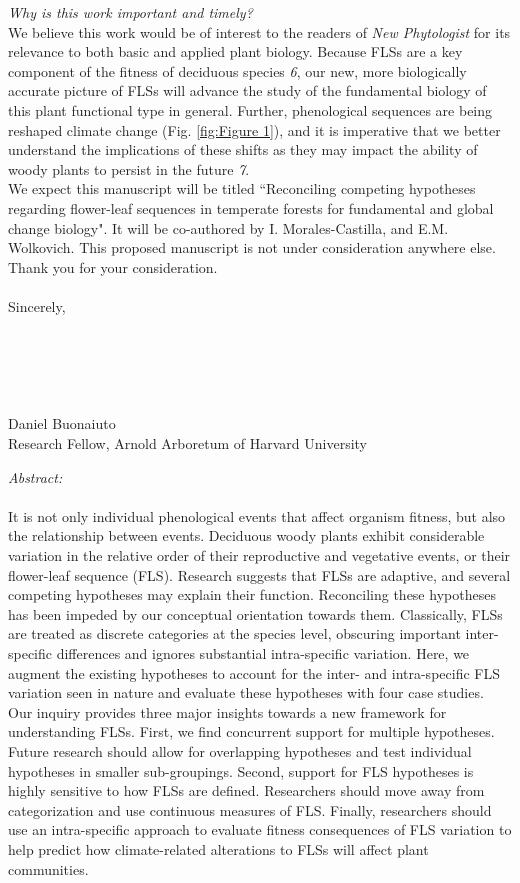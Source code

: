 \documentclass[10.5pt,a4paper]{letter}\usepackage[]{graphicx}\usepackage[]{color}
\begin{document}
\par\emph{Why is this work important and timely?}\\
\indent We believe this work would be of interest to the readers of \textit{New Phytologist} for its relevance to both basic and applied plant biology. Because FLSs are a key component of the fitness of deciduous species \emph{6}, our new, more biologically accurate picture of FLSs will advance the study of the fundamental biology of this plant functional type in general. Further, phenological sequences are being reshaped climate change (Fig. \ref{fig:Figure 1}), and it is imperative that we better understand the implications of these shifts as they may impact the ability of woody plants to persist in the future \emph{7}.\\
 \indent We expect this manuscript will be titled ``Reconciling competing hypotheses regarding flower-leaf sequences in temperate forests for fundamental and global change biology". It will be co-authored by I. Morales-Castilla, and E.M. Wolkovich. This proposed manuscript is not under consideration anywhere else. Thank you for your consideration.\\
\\Sincerely,\\
\\
\\
\\
\\
\\
Daniel Buonaiuto\\
\noindent Research Fellow, Arnold Arboretum of Harvard University 

\newpage


\noindent \emph{Abstract:}\\
\\
\indent It is not only individual phenological events that affect organism fitness, but also the relationship between events. Deciduous woody plants exhibit considerable variation in the relative order of their reproductive and vegetative events, or their flower-leaf sequence (FLS). Research suggests that FLSs are adaptive, and several competing hypotheses may explain their function. Reconciling these hypotheses has been impeded by our conceptual orientation towards them. Classically, FLSs are treated as discrete categories at the species level, obscuring important inter-specific differences and ignores substantial intra-specific variation. Here, we augment the existing hypotheses to account for the inter- and intra-specific FLS variation seen in nature and evaluate these hypotheses with four case studies. Our inquiry provides three major insights towards a new framework for understanding FLSs. First, we find concurrent support for multiple hypotheses. Future research should allow for overlapping hypotheses and test individual hypotheses in smaller sub-groupings. Second, support for FLS hypotheses is highly sensitive to how FLSs are defined. Researchers should move away from categorization and use continuous measures of FLS. Finally, researchers should use an intra-specific approach to evaluate fitness consequences of FLS variation to help predict how climate-related alterations to FLSs will affect plant communities.\\
\end{document}
